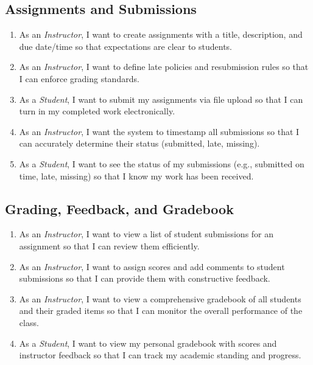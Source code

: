 \documentclass[11pt, legalpaper]{article}
\begin{document}
\subsection{Assignments and Submissions}
\begin{enumerate}[label=\textbf{US\,\arabic*}, start=14]
  \item As an \emph{Instructor}, I want to create assignments with a title,
        description, and due date/time so that expectations are clear to
        students.
  \item As an \emph{Instructor}, I want to define late policies and
        resubmission rules so that I can enforce grading standards.
  \item As a \emph{Student}, I want to submit my assignments via file upload
        so that I can turn in my completed work electronically.
  \item As an \emph{Instructor}, I want the system to timestamp all
        submissions so that I can accurately determine their status (submitted,
        late, missing).
  \item As a \emph{Student}, I want to see the status of my submissions (e.g.,
        submitted on time, late, missing) so that I know my work has been
        received.
\end{enumerate}

\subsection{Grading, Feedback, and Gradebook}
\begin{enumerate}[label=\textbf{US\,\arabic*}, start=19]
  \item As an \emph{Instructor}, I want to view a list of student submissions
        for an assignment so that I can review them efficiently.
  \item As an \emph{Instructor}, I want to assign scores and add comments to
        student submissions so that I can provide them with constructive
        feedback.
  \item As an \emph{Instructor}, I want to view a comprehensive gradebook of
        all students and their graded items so that I can monitor the overall
        performance of the class.
  \item As a \emph{Student}, I want to view my personal gradebook with scores
        and instructor feedback so that I can track my academic standing and
        progress.
\end{enumerate}
\end{document}
